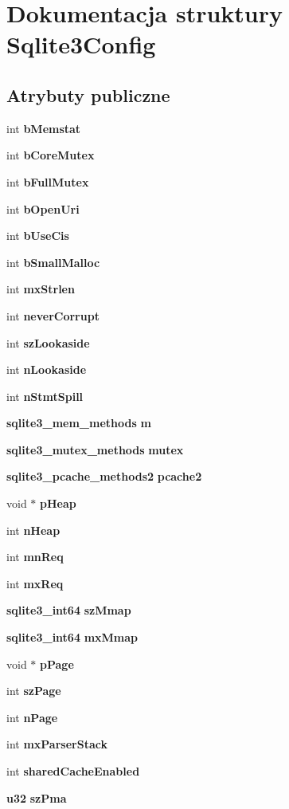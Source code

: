 \section{Dokumentacja struktury Sqlite3\+Config}
\label{struct_sqlite3_config}
\subsection*{Atrybuty publiczne}
\begin{DoxyCompactItemize}
\item 
int \textbf{ b\+Memstat}
\item 
int \textbf{ b\+Core\+Mutex}
\item 
int \textbf{ b\+Full\+Mutex}
\item 
int \textbf{ b\+Open\+Uri}
\item 
int \textbf{ b\+Use\+Cis}
\item 
int \textbf{ b\+Small\+Malloc}
\item 
int \textbf{ mx\+Strlen}
\item 
int \textbf{ never\+Corrupt}
\item 
int \textbf{ sz\+Lookaside}
\item 
int \textbf{ n\+Lookaside}
\item 
int \textbf{ n\+Stmt\+Spill}
\item 
\textbf{ sqlite3\+\_\+mem\+\_\+methods} \textbf{ m}
\item 
\textbf{ sqlite3\+\_\+mutex\+\_\+methods} \textbf{ mutex}
\item 
\textbf{ sqlite3\+\_\+pcache\+\_\+methods2} \textbf{ pcache2}
\item 
void $\ast$ \textbf{ p\+Heap}
\item 
int \textbf{ n\+Heap}
\item 
int \textbf{ mn\+Req}
\item 
int \textbf{ mx\+Req}
\item 
\textbf{ sqlite3\+\_\+int64} \textbf{ sz\+Mmap}
\item 
\textbf{ sqlite3\+\_\+int64} \textbf{ mx\+Mmap}
\item 
void $\ast$ \textbf{ p\+Page}
\item 
int \textbf{ sz\+Page}
\item 
int \textbf{ n\+Page}
\item 
int \textbf{ mx\+Parser\+Stack}
\item 
int \textbf{ shared\+Cache\+Enabled}
\item 
\textbf{ u32} \textbf{ sz\+Pma}

\end{DoxyCompactItemize}
